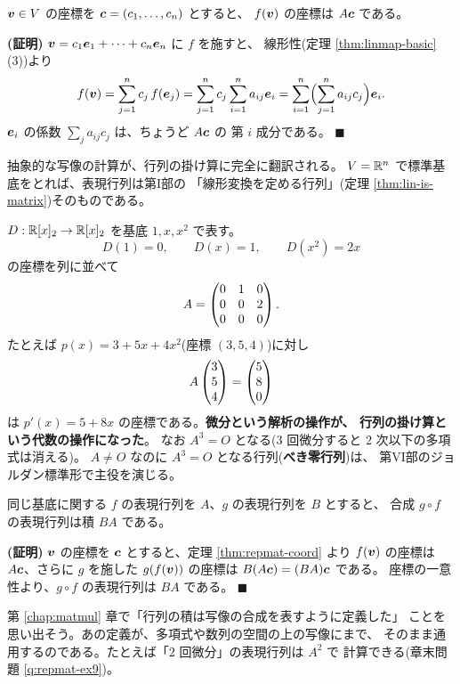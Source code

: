 \begin{teiri}[表現行列は座標の掛け算になる]\label{thm:repmat-coord}
$\bm{v} \in V$ の座標を $\bm{c} = (c_1, \dots, c_n)$ とすると、
$f(\bm{v})$ の座標は $A\bm{c}$ である。
\end{teiri}

\noindent\textbf{(証明)}\quad
$\bm{v} = c_1\bm{e}_1 + \cdots + c_n\bm{e}_n$ に $f$ を施すと、
線形性(定理 \ref{thm:linmap-basic}(3))より
\[
f(\bm{v}) = \sum_{j=1}^n c_j\,f(\bm{e}_j)
= \sum_{j=1}^n c_j \sum_{i=1}^n a_{ij}\bm{e}_i
= \sum_{i=1}^n \Bigl( \sum_{j=1}^n a_{ij}c_j \Bigr) \bm{e}_i.
\]
$\bm{e}_i$ の係数 $\sum_j a_{ij}c_j$ は、ちょうど $A\bm{c}$ の
第 $i$ 成分である。 $\blacksquare$

抽象的な写像の計算が、行列の掛け算に完全に翻訳される。
$V = \mathbb{R}^n$ で標準基底をとれば、表現行列は第I部の
「線形変換を定める行列」(定理 \ref{thm:lin-is-matrix})そのものである。

\begin{rei}[微分の表現行列]
$D : \mathbb{R}[x]_2 \to \mathbb{R}[x]_2$ を基底 $1, x, x^2$ で表す。
\[
D(1) = 0, \qquad D(x) = 1, \qquad D(x^2) = 2x
\]
の座標を列に並べて
\[
A = \begin{pmatrix}0 & 1 & 0 \\ 0 & 0 & 2 \\ 0 & 0 & 0\end{pmatrix}.
\]
たとえば $p(x) = 3 + 5x + 4x^2$(座標 $(3, 5, 4)$)に対し
\[
A \begin{pmatrix}3 \\ 5 \\ 4\end{pmatrix} = \begin{pmatrix}5 \\ 8 \\ 0\end{pmatrix}
\]
は $p'(x) = 5 + 8x$ の座標である。\textbf{微分という解析の操作が、
行列の掛け算という代数の操作になった}。
なお $A^3 = O$ となる($3$ 回微分すると $2$ 次以下の多項式は消える)。
$A \neq O$ なのに $A^3 = O$ となる行列(\textbf{べき零行列})は、
第VI部のジョルダン標準形で主役を演じる。
\end{rei}

\begin{teiri}[合成の表現行列は行列の積]\label{thm:repmat-comp}
同じ基底に関する $f$ の表現行列を $A$、$g$ の表現行列を $B$ とすると、
合成 $g \circ f$ の表現行列は積 $BA$ である。
\end{teiri}

\noindent\textbf{(証明)}\quad
$\bm{v}$ の座標を $\bm{c}$ とすると、定理 \ref{thm:repmat-coord} より
$f(\bm{v})$ の座標は $A\bm{c}$、さらに $g$ を施した
$g(f(\bm{v}))$ の座標は $B(A\bm{c}) = (BA)\bm{c}$ である。
座標の一意性より、$g \circ f$ の表現行列は $BA$ である。 $\blacksquare$

第 \ref{chap:matmul} 章で「行列の積は写像の合成を表すように定義した」
ことを思い出そう。あの定義が、多項式や数列の空間の上の写像にまで、
そのまま通用するのである。たとえば「$2$ 回微分」の表現行列は $A^2$ で
計算できる(章末問題 \ref{q:repmat-ex9})。

